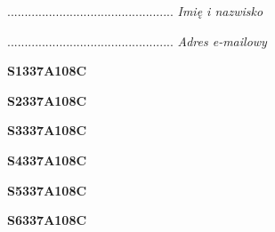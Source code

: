 \begin{turn}{90}\begin{minipage}{\linewidth} \vspace{20mm} ................................................  \textit{Imię i nazwisko}\end{minipage}\end{turn}

\begin{turn}{90}\begin{minipage}{\linewidth} \vspace{20mm} ................................................  \textit{Adres e-mailowy}\end{minipage}\end{turn}

\begin{turn}{90}\huge \begin{minipage}{\linewidth} \vspace{10mm}\textbf{S1337A108C}\end{minipage}\end{turn}

\begin{turn}{90}\huge \begin{minipage}{\linewidth} \vspace{10mm}\textbf{S2337A108C}\end{minipage}\end{turn}

\begin{turn}{90}\huge \begin{minipage}{\linewidth} \vspace{10mm}\textbf{S3337A108C}\end{minipage}\end{turn}

\begin{turn}{90}\huge \begin{minipage}{\linewidth} \vspace{10mm}\textbf{S4337A108C}\end{minipage}\end{turn}

\begin{turn}{90}\huge \begin{minipage}{\linewidth} \vspace{10mm}\textbf{S5337A108C}\end{minipage}\end{turn}

\begin{turn}{90}\huge \begin{minipage}{\linewidth} \vspace{10mm}\textbf{S6337A108C}\end{minipage}\end{turn}

